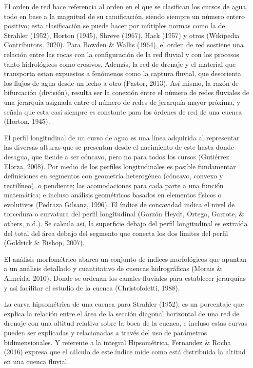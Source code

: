 \documentclass[11pt,]{article}
\begin{document}
El orden de red hace referencia al orden en el que se clasifican los
cursos de agua, todo en base a la magnitud de su ramificación, siendo
siempre un número entero positivo; esta clasificación se puede hacer por
mútiples normas como la de Strahler (1952), Horton (1945), Shreve
(1967), Hack (1957) y otros (Wikipedia Contributors, 2020). Para Bowden
\& Wallis (1964), el orden de red sostiene una relación entre las rocas
con la configuración de la red fluvial y con los procesos tanto
hidrológicos como erosivos. Además, la red de drenaje y el material que
transporta estan expuestos a fenómenos como la captura fluvial, que
desorienta los flujos de agua desde un lecho a otro (Pastor, 2013). Así
mismo, la razón de bifurcación (división), resulta ser la conexión entre
el número de redes fluviales de una jerarquía asignada entre el número
de redes de jerarquía mayor próxima, y señala que esta casi siempre es
constante para los órdenes de red de una cuenca (Horton, 1945).

El perfil longitudinal de un curso de agua es una línea adquirida al
representar las diversas alturas que se presentan desde el nacimiento de
este hasta donde desagua, que tiende a ser cóncavo, pero no para todos
los cursos (Gutiérrez Elorza, 2008). Por medio de los perfiles
longitudinales es posible fundamentar definiciones en segmentos con
geometría heterogénea (cóncavo, convexo y rectilíneo), o pendiente; las
acomodaciones para cada parte a una función matemática; e incluso
análisis geométricos basados en elementos físicos o evolutivos (Pedraza
Gilsanz, 1996). El índice de concavidad indica el nivel de torcedura o
curvatura del perfil longitudinal (Garzón Heydt, Ortega, Garrote, \&
others, n.d.). Se calcula así, la superficie debajo del perfil
longitudinal es extraída del total del área debajo del segmento que
conecta los dos límites del perfil (Goldrick \& Bishop, 2007).

El análisis morfométrico abarca un conjunto de índices morfológicos que
apuntan a un análisis detallado y cuantitativo de cuencas hidrográficas
(Morais \& Almeida, 2010). Donde se ordenan los canales fluviales para
establecer jerarquías y asi facilitar el estudio de la cuenca
(Christofoletti, 1988).

La curva hipsométrica de una cuenca para Strahler (1952), es un
porcentaje que explica la relación entre el área de la sección diagonal
horizontal de una red de drenaje con una altitud relativa sobre la boca
de la cuenca, e incluso estas curvas pueden ser explicadas y
relacionadas a través del uso de parámetros bidimensionales. Y referente
a la integral Hipsométrica, Fernandez \& Rocha (2016) expresa que el
cálculo de este índice mide como está distribuida la altitud en una
cuenca fluvial.
\end{document}
